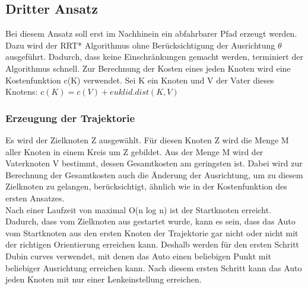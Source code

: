 \subsection{Dritter Ansatz}
Bei diesem Ansatz soll erst im Nachhinein ein abfahrbarer Pfad erzeugt werden. Dazu wird der RRT* Algorithmus ohne Berücksichtigung der Ausrichtung $\theta$ ausgeführt. Dadurch, dass keine Einschränkungen gemacht werden, terminiert der Algorithmus schnell. Zur Berechnung der Kosten eines jeden Knoten wird eine Kostenfunktion c(K) verwendet. Sei K ein Knoten und V der Vater dieses Knotens: 
$c(K) = c(V) + euklid. dist(K,V)$   \\
\subsubsection{Erzeugung der Trajektorie}
Es wird der Zielknoten Z ausgewählt. Für diesen Knoten Z wird die Menge M aller Knoten in einem Kreis um Z gebildet.  Aus der Menge M wird der Vaterknoten V bestimmt, dessen Gesamtkosten am geringsten ist. Dabei wird zur Berechnung der Gesamtkosten auch die Änderung der Ausrichtung, um zu diesem Zielknoten zu gelangen, berücksichtigt, ähnlich wie in der Kostenfunktion des ersten Ansatzes. \\
Nach einer Laufzeit von maximal O(n log n) ist der Startknoten erreicht. Dadurch, dass vom Zielknoten aus gestartet wurde, kann es sein, dass das Auto vom Startknoten aus den ersten Knoten der Trajektorie gar nicht oder nicht mit der richtigen Orientierung erreichen kann. Deshalb werden für den ersten Schritt Dubin curves verwendet, mit denen das Auto einen beliebigen Punkt mit beliebiger Ausrichtung erreichen kann. Nach diesem ersten Schritt kann das Auto jeden Knoten mit nur einer Lenkeinstellung erreichen. \\

